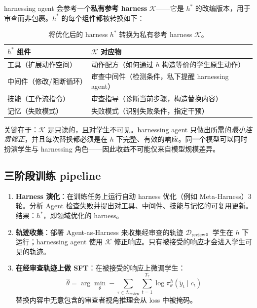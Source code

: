 harnessing agent 会参考一个\textbf{私有参考 harness} $\mathcal{K}$——它是 $h^*$ 的改编版本，用于审查而非包裹。$h^*$ 的每个组件都被转换如下：

\begin{table}[ht!]
\centering
\caption{将优化后的 harness $h^*$ 转换为私有参考 harness $\mathcal{K}$。}
{\small
\begin{tabular}{@{}lp{9cm}@{}}
\toprule
\textbf{$h^*$ 组件} & \textbf{$\mathcal{K}$ 对应物} \\
\midrule
工具（扩展动作空间） & 动作配方（如何通过 $h$ 构造等价的学生原生动作） \\
中间件（修改/阻断循环） & 审查中间件（检测条件，私下提醒 harnessing agent） \\
技能（工作流指令） & 审查指导（诊断当前步骤，构造替换内容） \\
记忆（失败模式） & 失败模式（识别失败条件，指定干预） \\
\bottomrule
\end{tabular}
}
\end{table}

关键在于：$\mathcal{K}$ 是只读的，且对学生不可见。harnessing agent 只做出所需的\emph{最小连贯修正}，并且每次替换都必须是在 $h$ 下完整、有效的响应。同一个模型可以同时扮演学生与 harnessing 角色——因此收益不可能仅来自模型规模差异。

\subsection{三阶段训练 pipeline}
\label{subsec:harness-zero-pipeline}

\begin{enumerate}
  \item \textbf{Harness 演化}：在训练任务上运行自动 harness 优化（例如 Meta-Harness）3 轮。分析 Agent 检查失败并提出对工具、中间件、技能与记忆的可复用更新。结果：$h^*$，即领域优化的 harness。

  \item \textbf{轨迹收集}：部署 Agent-as-Harness 来收集经审查的轨迹 $\mathcal{D}_{\mathrm{review}}$。学生在 $h$ 下运行；harnessing agent 使用 $\mathcal{K}$ 修正响应。只有被接受的响应才会进入学生可见的轨迹。

  \item \textbf{在经审查轨迹上做 SFT}：在被接受的响应上微调学生：
\begin{equation}
\hat{\theta} = \arg\min_\theta -\sum_{\tau \in \mathcal{D}_{\mathrm{review}}} \sum_{t=1}^{T_\tau} \log \pi^h_\theta(\tilde{y}_t \mid c_t)
\end{equation}
替换内容中无意包含的审查者视角推理会从 loss 中被掩码。
\end{enumerate}

